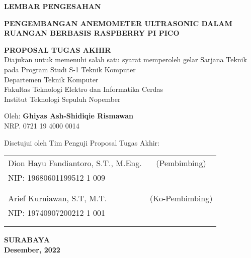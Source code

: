 \begin{center}
	\large
  \textbf{LEMBAR PENGESAHAN}
\end{center}

\thispagestyle{empty}

\begin{center}
  \textbf{PENGEMBANGAN ANEMOMETER ULTRASONIC DALAM RUANGAN
  	BERBASIS RASPBERRY PI PICO}
\end{center}

\begingroup
  \small

  \begin{center}
    \textbf{PROPOSAL TUGAS AKHIR} \\
    Diajukan untuk memenuhi salah satu syarat memperoleh gelar
    Sarjana Teknik pada 
    Program Studi S-1 Teknik Komputer \\
    Departemen Teknik Komputer \\
    Fakultas Teknologi Elektro dan Informatika Cerdas \\
    Institut Teknologi Sepuluh Nopember
  \end{center}

  \begin{center}
    Oleh: \textbf{Ghiyas Ash-Shidiqie Rismawan} \\
    NRP. 0721 19 4000 0014
  \end{center}

  \begin{center}
    Disetujui oleh Tim Penguji Proposal Tugas Akhir:
  \end{center}

  \begingroup
    \setlength{\tabcolsep}{0pt}

    \noindent
    \begin{tabularx}{\textwidth}{X c}
      Dion Hayu Fandiantoro, S.T., M.Eng.          & (Pembimbing) \\
      NIP: 19680601199512 1 009       & \\
      &  \\
      &  \\
      Arief Kurniawan, S.T, M.T.     & (Ko-Pembimbing) \\
      NIP: 19740907200212 1 001        & \\
      &  \\
      &  \\
    \end{tabularx}
  \endgroup

  \vspace{4ex}

  \begin{center}
    \textbf{SURABAYA} \\
    \textbf{Desember, 2022}
  \end{center}
\endgroup

